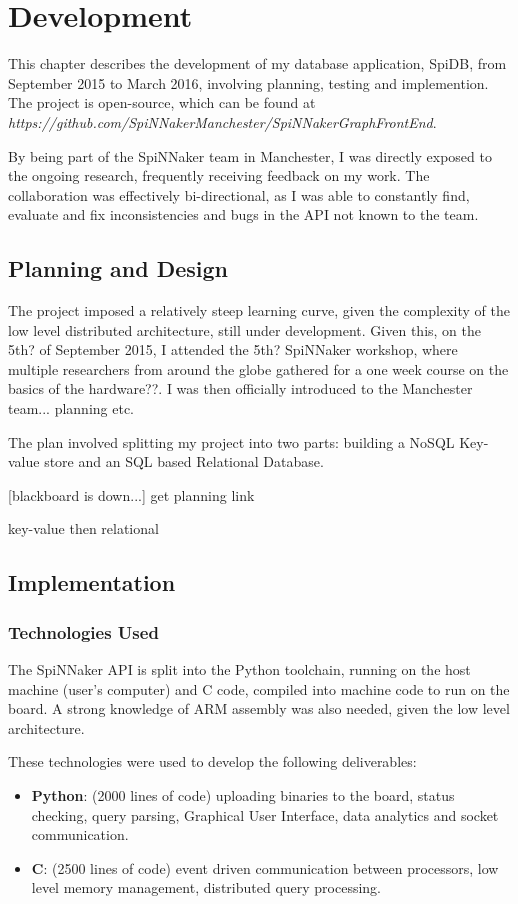 \chapter{Development}

This chapter describes the development of my database application, SpiDB, from September 2015 to March 2016, involving planning, testing and implemention. The project is open-source, which can be found at
\textit{https://github.com/SpiNNakerManchester/SpiNNakerGraphFrontEnd}.

By being part of the SpiNNaker team in Manchester, I was directly exposed to the ongoing research, frequently receiving feedback on my work. The collaboration was effectively bi-directional, as I was able to constantly find, evaluate and fix inconsistencies and bugs in the API not known to the team.

\section{Planning and Design}
The project imposed a relatively steep learning curve, given the complexity of the low level distributed architecture, still under development. Given this, on the 5th? of September 2015, I attended the 5th? SpiNNaker workshop, where multiple researchers from around the globe gathered for a one week course on the basics of the hardware??. I was then officially introduced to the Manchester team... planning etc.

The plan involved splitting my project into two parts: building a NoSQL Key-value store and an SQL based Relational Database.

[blackboard is down...] get planning link

key-value then relational

\section{Implementation}

\subsection{Technologies Used}
The SpiNNaker API is split into the Python toolchain, running on the host machine (user's computer) and C code, compiled into machine code to run on the board. A strong knowledge of ARM assembly was also needed, given the low level architecture.
 
These technologies were used to develop the following deliverables:
\begin{itemize}
	\item \textbf{Python}: (2000 lines of code) uploading binaries to the board, status checking, query parsing, Graphical User Interface, data analytics and socket communication.
	\item \textbf{C}: (2500 lines of code) event driven communication between processors, low level memory management, distributed query processing.
\end{itemize}

